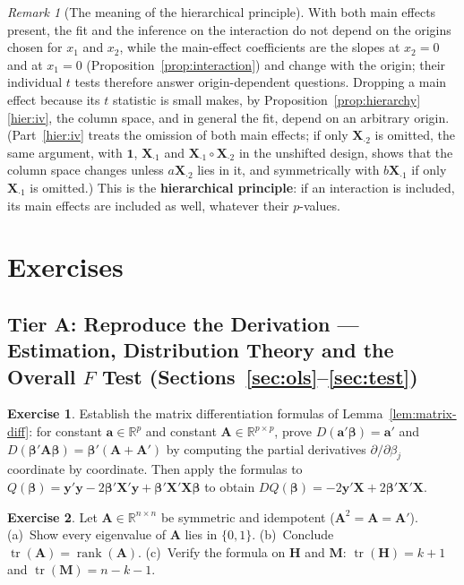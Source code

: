 \documentclass[14pt]{extarticle}
\theoremstyle{plain}
\theoremstyle{definition}
\newtheorem{exercise}{Exercise}
\newcommand{\extier}{}
\newcommand{\exercisetier}[1]{\renewcommand{\extier}{#1}\setcounter{exercise}{0}}
\theoremstyle{remark}
\newtheorem{remark}[theorem]{Remark}
\DeclareMathOperator\tr{tr}
\DeclareMathOperator\rank{rank}
\newcommand{\bX}{\mathbf{X}}
\newcommand{\by}{\mathbf{y}}
\def\bb{\boldsymbol{\beta}}
\newcommand{\bH}{\mathbf{H}}
\newcommand{\bM}{\mathbf{M}}
\newcommand{\bone}{\mathbf{1}}
\newcommand{\bA}{\mathbf{A}}
\newcommand{\ba}{\mathbf{a}}
\newcommand{\Real}{\mathbb{R}}
\begin{document}
\begin{remark}[The meaning of the hierarchical principle]\label{rem:hierarchy}
With both main effects present, the fit and the inference on the interaction do not depend on the origins chosen for $x_1$ and $x_2$, while the main-effect coefficients are the slopes at $x_2 = 0$ and at $x_1 = 0$ (Proposition~\ref{prop:interaction}) and change with the origin; their individual $t$ tests therefore answer origin-dependent questions. Dropping a main effect because its $t$ statistic is small makes, by Proposition~\ref{prop:hierarchy}\ref{hier:iv}, the column space, and in general the fit, depend on an arbitrary origin. (Part~\ref{hier:iv} treats the omission of both main effects; if only $\bX_{\cdot 2}$ is omitted, the same argument, with $\bone$, $\bX_{\cdot 1}$ and $\bX_{\cdot 1} \circ \bX_{\cdot 2}$ in the unshifted design, shows that the column space changes unless $a\bX_{\cdot 2}$ lies in it, and symmetrically with $b\bX_{\cdot 1}$ if only $\bX_{\cdot 1}$ is omitted.) This is the \textbf{hierarchical principle}: if an interaction is included, its main effects are included as well, whatever their $p$-values.
\end{remark}

\section{Exercises}

\exercisetier{A}
\subsection*{Tier A: Reproduce the Derivation --- Estimation, Distribution Theory and the Overall $F$ Test (Sections~\ref{sec:ols}--\ref{sec:test})}

\begin{exercise}\label{ex:A1}
Establish the matrix differentiation formulas of Lemma~\ref{lem:matrix-diff}: for constant $\ba\in\Real^p$ and constant $\bA\in\Real^{p\times p}$, prove $D(\ba'\bb)=\ba'$ and $D(\bb'\bA\bb)=\bb'(\bA+\bA')$ by computing the partial derivatives $\partial/\partial\beta_j$ coordinate by coordinate. Then apply the formulas to $Q(\bb) = \by'\by - 2\bb'\bX'\by + \bb'\bX'\bX\bb$ to obtain $DQ(\bb) = -2\by'\bX + 2\bb'\bX'\bX$.
\end{exercise}

\begin{exercise}\label{ex:A2}
Let $\bA\in\Real^{n\times n}$ be symmetric and idempotent ($\bA^2=\bA=\bA'$). (a)~Show every eigenvalue of $\bA$ lies in $\{0,1\}$. (b)~Conclude $\tr(\bA)=\rank(\bA)$. (c)~Verify the formula on $\bH$ and $\bM$: $\tr(\bH)=k+1$ and $\tr(\bM)=n-k-1$.
\end{exercise}
\end{document}
